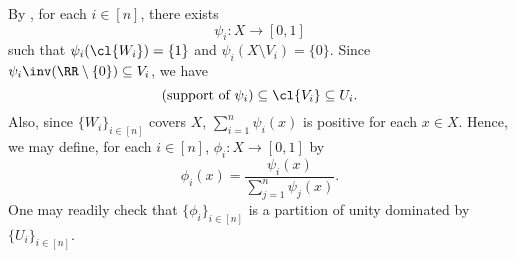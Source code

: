 \documentclass[MAS331_Note.tex]{subfiles}
\begin{document}
{    By , for each $i \in [n]$, there exists
    \[
        \psi_i \colon X \to [0, 1]
    \]
    such that $\psi_i(\cl{W_i}) = \{1\}$ and $\psi_i(X \setminus V_i) = \{0\}$.
    Since $\psi_i\inv(\RR \setminus \{0\}) \subseteq V_i$, we have
    \[
        (\text{support of } \psi_i) \subseteq \cl{V_i} \subseteq U_i\text{.}
    \]
    Also, since $\{W_i\}_{i \in [n]}$ covers $X$, $\sum_{i=1}^{n} \psi_i(x)$
    is positive for each $x \in X$. Hence, we may define, for each $i \in [n]$,
    $\phi_i \colon X \to [0, 1]$ by
    \[
        \phi_i(x) = \frac{\psi_i(x)}{\sum_{j=1}^{n} \psi_j(x)}\text{.}
    \]
    One may readily check that $\{\phi_i\}_{i \in [n]}$ is a partition of unity
    dominated by $\{U_i\}_{i \in [n]}$.
}

\end{document}
